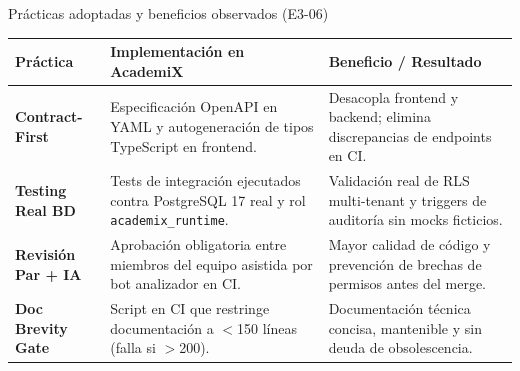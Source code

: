 
\begin{frame}{Prácticas adoptadas y beneficios observados (E3-06)}
\small
\begin{table}[h]
\centering
\begin{tabularx}{\textwidth}{l p{5.2cm} Y}
\toprule
\textbf{Práctica} & \textbf{Implementación en AcademiX} & \textbf{Beneficio / Resultado} \\
\midrule
\textbf{Contract-First} & Especificación OpenAPI en YAML y autogeneración de tipos TypeScript en frontend. & Desacopla frontend y backend; elimina discrepancias de endpoints en CI. \\
\addlinespace
\textbf{Testing Real BD} & Tests de integración ejecutados contra PostgreSQL 17 real y rol \texttt{academix\_runtime}. & Validación real de RLS multi-tenant y triggers de auditoría sin mocks ficticios. \\
\addlinespace
\textbf{Revisión Par + IA} & Aprobación obligatoria entre miembros del equipo asistida por bot analizador en CI. & Mayor calidad de código y prevención de brechas de permisos antes del merge. \\
\addlinespace
\textbf{Doc Brevity Gate} & Script en CI que restringe documentación a $<$150 líneas (falla si $>$200). & Documentación técnica concisa, mantenible y sin deuda de obsolescencia. \\
\bottomrule
\end{tabularx}
\end{table}
\vspace{0.1cm}
\end{frame}

